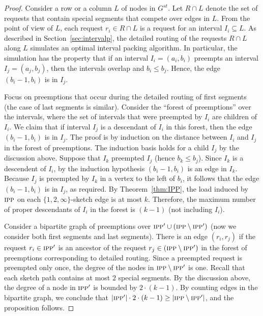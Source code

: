 \documentclass[11pt]{article}
\newcommand{\route}{\text{\sc{ipp}}}
\newcommand{\IPP}{\route}
\newenvironment{proof sketch}[1]{\noindent {\emph{Proof sketch of #1:}}}{\hfill \qed}
\begin{document}
\begin{proof}
  Consider a row or a column $L$ of nodes in $G^{st}$. Let $R\cap L$ denote the set of requests that contain special
  segments that compete over edges in $L$. From the point of view of
  $L$, each request $r_i\in R\cap L$ is a request for an interval
  $I_i\subseteq L$.
  As described in Section~\ref{sec:intervalp}, the detailed routing of the requests $R\cap L$ along  $L$ simulates an optimal interval packing algorithm. In
  particular, the simulation has the property that if an interval
  $I_i=(a_i,b_i)$ preempts an interval $I_j=(a_j,b_j)$, then the intervals overlap
  and $b_i \leq
  b_j$. Hence, the edge $(b_i-1,b_i)$ is in $I_j$.


  Focus on preemptions that occur during the detailed routing of first segments (the
  case of last segments is similar). Consider the ``forest of preemptions'' over the
  intervals, where the set of intervals that were preempted by $I_i$ are children of
  $I_i$.  We claim that if interval $I_j$ is a descendant of $I_i$ in this forest,
  then the edge $(b_i-1,b_i)$ is in $I_j$.  The proof is by induction on the distance
  between $I_i$ and $I_j$ in the forest of preemptions. The induction basis holds for
  a child $I_j$ by the discussion above.  Suppose that $I_k$ preempted $I_j$ (hence
  $b_k\leq b_j$). Since $I_k$ is a descendent of $I_i$, by the induction hypothesis
  $(b_i-1,b_i)$ is an edge in $I_k$. Because $I_j$ is preempted by $I_k$ in a vertex
  to the left of $b_i$, it follows that the edge $(b_{i}-1,b_i)$ is in $I_j$, as
  required.  By Theorem~\ref{thm:IPP}, the load induced by $\IPP$ on each
  $\{1,2,\infty\}$-sketch edge is at most $k$.  Therefore, the maximum number of
  proper descendants of $I_i$ in the forest is $(k-1)$ (not including $I_i$).

  Consider a bipartite graph of preemptions over $\IPP'\cup (\IPP\setminus \IPP')$
  (now we consider both first segments and last segments). There is an edge
  $(r_i,r_j)$ if the request $r_i\in \IPP'$ is an ancestor of the request $r_j\in
  (\IPP\setminus \IPP')$ in the forest of preemptions corresponding to detailed
  routing. Since a preempted request is preempted only once, the degree of the nodes
  in $\IPP\setminus \IPP'$ is one.  Recall that each sketch path contains at most $2$
  special segments.  By the discussion above, the degree of a node in $\IPP'$ is
  bounded by $2\cdot(k-1)$. By counting edges in the bipartite graph, we conclude that $|\IPP'| \cdot 2
  \cdot(k-1) \geq |\IPP\setminus \IPP'|$, and the proposition follows.
\end{proof}
\end{document}
